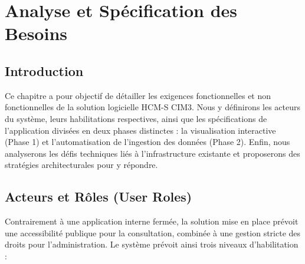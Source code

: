 \chapter{Analyse et Spécification des Besoins}
\label{chap:analyse_besoins}

\section*{Introduction}
Ce chapitre a pour objectif de détailler les exigences fonctionnelles et non fonctionnelles de la solution logicielle HCM-S CIM3. Nous y définirons les acteurs du système, leurs habilitations respectives, ainsi que les spécifications de l'application divisées en deux phases distinctes : la visualisation interactive (Phase 1) et l'automatisation de l'ingestion des données (Phase 2). Enfin, nous analyserons les défis techniques liés à l'infrastructure existante et proposerons des stratégies architecturales pour y répondre.

\section{Acteurs et Rôles (User Roles)}
Contrairement à une application interne fermée, la solution mise en place prévoit une accessibilité publique pour la consultation, combinée à une gestion stricte des droits pour l'administration. Le système prévoit ainsi trois niveaux d'habilitation :

